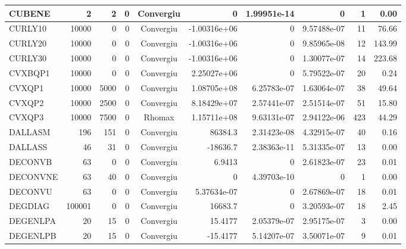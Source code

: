 \begin{center}
\begin{longtable}{|l|r|r|r|c|r|r|r|r|r|}
  CUBENE &      2 &      2 &      0 & Convergiu  &           0 &    1.99951e-14 &           0 &      1 &    0.00 \\ \hline
 CURLY10 &  10000 &      0 &      0 & Convergiu  & -1.00316e+06 &              0 & 9.57488e-07 &     11 &   76.66 \\ \hline
 CURLY20 &  10000 &      0 &      0 & Convergiu  & -1.00316e+06 &              0 & 9.85965e-08 &     12 &  143.99 \\ \hline
 CURLY30 &  10000 &      0 &      0 & Convergiu  & -1.00316e+06 &              0 & 1.30077e-07 &     14 &  223.68 \\ \hline
 CVXBQP1 &  10000 &      0 &      0 & Convergiu  & 2.25027e+06 &              0 & 5.79522e-07 &     20 &    0.24 \\ \hline
  CVXQP1 &  10000 &   5000 &      0 & Convergiu  & 1.08705e+08 &    6.25783e-07 & 1.63064e-07 &     38 &   49.64 \\ \hline
  CVXQP2 &  10000 &   2500 &      0 & Convergiu  & 8.18429e+07 &    2.57441e-07 & 2.51514e-07 &     51 &   15.80 \\ \hline
  CVXQP3 &  10000 &   7500 &      0 & Rhomax     & 1.15711e+08 &    9.63131e-07 & 2.94122e-06 &    423 &   44.29 \\ \hline
 DALLASM &    196 &    151 &      0 & Convergiu  &     86384.3 &    2.31423e-08 & 4.32915e-07 &     40 &    0.16 \\ \hline
 DALLASS &     46 &     31 &      0 & Convergiu  &    -18636.7 &    2.38363e-11 & 5.31335e-07 &     13 &    0.00 \\ \hline
 DECONVB &     63 &      0 &      0 & Convergiu  &      6.9413 &              0 & 2.61823e-07 &     23 &    0.01 \\ \hline
DECONVNE &     63 &     40 &      0 & Convergiu  &           0 &    4.39703e-10 &           0 &      1 &    0.00 \\ \hline
 DECONVU &     63 &      0 &      0 & Convergiu  & 5.37634e-07 &              0 & 2.67869e-07 &     18 &    0.01 \\ \hline
 DEGDIAG & 100001 &      0 &      0 & Convergiu  &     16683.7 &              0 & 3.20593e-07 &     18 &    2.45 \\ \hline
DEGENLPA &     20 &     15 &      0 & Convergiu  &     15.4177 &    2.05379e-07 & 2.95175e-07 &      3 &    0.00 \\ \hline
DEGENLPB &     20 &     15 &      0 & Convergiu  &    -15.4177 &    5.14207e-07 & 3.50071e-07 &      9 &    0.01 \\ \hline

\end{longtable}
\end{center}
